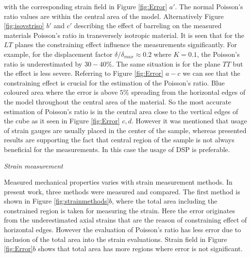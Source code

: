 \documentclass[review]{elsarticle}
\begin{document}
with the corresponding strain field in Figure \ref{fig:Error} $a'$. The normal
Poisson's ratio values are within the central area of the model. 
Alternatively Figure \ref{fig:isovstriso} $b'$ and $c'$ describing the effect
of barreling on the measured materials Poisson's ratio in transversely isotropic material. 
It is seen that for the $LT$ planes the constraining effect influence the
measurements significantly. For example, for the displacement factor $\delta/\delta_{max}\approx0.2 $ where $K=0.1$,  the Poisson's ratio is
underestimated by $30-40\%$.
The same situation is for the plane $TT$ but the effect is less severe.
Referring to Figure \ref{fig:Error} $a-c$  we can see that the constraining effect is
crucial for the estimation of the Poisson's ratio. Blue coloured area where the error is above $5\%$ spreading from the horizontal edges of 
the model throughout the central area of the material. So the most accurate
estimation of Poisson's ratio is in the central area close to the vertical
edges of the cube as it seen in Figure \ref{fig:Error} $c,d$. However it was
mentioned that usage of strain gauges are usually placed in the center of the
sample, whereas presented results are supporting the fact that central
region of the sample is not always beneficial for the measurements. In this
case the usage of DSP is preferable. 


\begin{description}
\item{\textit{Strain measurement}}
\end{description}
Measured mechanical properties varies with strain measurement methods. In
present work, three methods were measured and compared. The
first method is shown in Figure \ref{fig:strainmethods}$b$, where the total area
including the constrained region is taken for measuring the strain.  
Here the error originates from the underestimated axial strains that are the
reason of constraining effect of horizontal edges. However the evaluation of
Poisson's ratio has less error due to inclusion of the total area into the
strain evaluations. Strain field in Figure \ref{fig:Error}$b$ shows that total
area has more regions where error is not significant.
\end{document}
